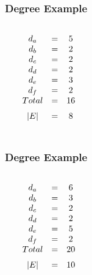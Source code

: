 \documentclass[dvipsnames]{beamer}
\begin{document}
\begin{frame}
  \frametitle{Degree Example}

  \begin{example}[plain]
    \begin{columns}
      \begin{center}
      \end{center}

      $\begin{array}{ccc}
      d_a & = & 5\\
      d_b & = & 2\\
      d_c & = & 2\\
      d_d & = & 2\\
      d_e & = & 3\\
      d_f & = & 2\\
      \medskip
      Total & = & 16\\
      \medskip
      |E| & = & 8
      \end{array}$
    \end{columns}
  \end{example}
\end{frame}

\begin{frame}
  \frametitle{Degree Example}

  \begin{example}[multigraph]
    \begin{columns}
      \begin{center}
      \end{center}

      $\begin{array}{ccc}
      d_a & = & 6\\
      d_b & = & 3\\
      d_c & = & 2\\
      d_d & = & 2\\
      d_e & = & 5\\
      d_f & = & 2\\
      \medskip
      Total & = & 20\\
      \medskip
      |E| & = & 10
      \end{array}$
    \end{columns}
  \end{example}
\end{frame}
\end{document}
